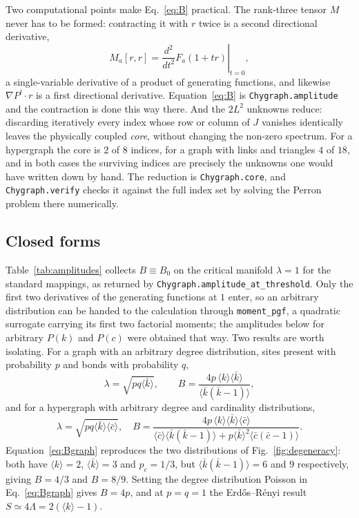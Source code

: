 \documentclass[aps,pre,twocolumn,superscriptaddress,floatfix,longbibliography]{revtex4-2}
\newcommand{\ave}[1]{\langle #1 \rangle}
\newcommand{\kb}{\bar{k}}
\newcommand{\cb}{\bar{c}}
\newcommand{\code}[1]{\texttt{#1}}
\begin{document}
Two computational points make Eq.~\eqref{eq:B} practical. The rank-three tensor
$M$ never has to be formed: contracting it with $r$ twice is a second
directional derivative,
\begin{equation}
  M_a[r,r]=\left.\frac{d^2}{dt^2}F_a(1+tr)\right|_{t=0},
\end{equation}
a single-variable derivative of a product of generating functions, and likewise
$\nabla P^l\cdot r$ is a first directional derivative. Equation~\eqref{eq:B} is
\code{Chygraph.amplitude} and the contraction is done this way there. And the
$2L^2$ unknowns reduce: discarding iteratively every index whose row or column of $J$ vanishes
identically leaves the physically coupled \emph{core}, without changing the
non-zero spectrum. For a hypergraph the core is $2$ of $8$ indices, for a graph
with links and triangles $4$ of $18$, and in both cases the surviving indices
are precisely the unknowns one would have written down by hand. The reduction is
\code{Chygraph.core}, and \code{Chygraph.verify} checks it against the full
index set by solving the Perron problem there numerically.

\subsection{Closed forms}\label{sec:closedforms}

Table~\ref{tab:amplitudes} collects $B\equiv B_0$ on the critical manifold
$\lambda=1$ for the standard mappings, as returned by
\code{Chygraph.amplitude\_at\_threshold}. Only the first two derivatives of the
generating functions at $1$ enter, so an arbitrary distribution can be handed to
the calculation through \code{moment\_pgf}, a quadratic surrogate carrying its
first two factorial moments; the amplitudes below for arbitrary $P(k)$ and
$P(c)$ were obtained that way. Two results are worth isolating. For a
graph with an arbitrary degree distribution, sites present with probability $p$
and bonds with probability $q$,
\begin{equation}
  \lambda=\sqrt{pq\ave{\kb}},\qquad
  B=\frac{4p\,\ave{k}\ave{\kb}}{\ave{\kb(\kb-1)}},
  \label{eq:Bgraph}
\end{equation}
and for a hypergraph with arbitrary degree and cardinality distributions,
\begin{equation}
  \lambda=\sqrt{pq\ave{\kb}\ave{\cb}},\quad
  B=\frac{4p\,\ave{k}\ave{\kb}\ave{\cb}}
         {\ave{\cb}\ave{\kb(\kb-1)}+p\ave{\kb}^2\ave{\cb(\cb-1)}}.
  \label{eq:Bhyper}
\end{equation}
Equation~\eqref{eq:Bgraph} reproduces the two distributions of
Fig.~\ref{fig:degeneracy}: both have $\ave{k}=2$, $\ave{\kb}=3$ and $p_c=1/3$,
but $\ave{\kb(\kb-1)}=6$ and $9$ respectively, giving $B=4/3$ and $B=8/9$.
Setting the degree distribution Poisson in Eq.~\eqref{eq:Bgraph} gives $B=4p$,
and at $p=q=1$ the Erd\H{o}s--R\'enyi result $S\simeq4\Lambda=2(\ave{k}-1)$.
\end{document}
